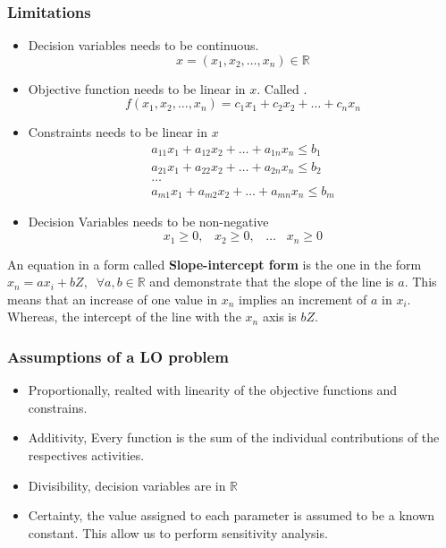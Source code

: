\subsubsection{Limitations}
\begin{itemize}
    \item Decision variables needs to be continuous. 
        \[x = (x_1, x_2, \dots , x_n) \in \mathbb{R}\]
    \item Objective function needs to be linear in $x$. Called \textit{}.
        \[ f(x_1,x_2, \dots, x_n) = c_1x_1 + c_2x_2 + \dots + c_nx_n \]
    \item Constraints needs to be linear in $x$
        \begin{gather*}
            a_{11}x_1 + a_{12}x_2 + \dots + a_{1n}x_n \leq b_1 \\
            a_{21}x_1 + a_{22}x_2 + \dots + a_{2n}x_n \leq b_2 \\
            \dots\\
            a_{m1}x_1 + a_{m2}x_2 + \dots + a_{mn}x_n \leq b_m
        \end{gather*}
    \item Decision Variables needs to be non-negative
        \[ x_1 \geq 0,\;\;\; x_2 \geq 0,\;\;\; \dots\;\;\; x_n \geq 0 \]
\end{itemize}

An equation in a form called \textbf{Slope-intercept form} is the one in the form $x_n = ax_i + bZ,\;\; \forall a,b \in \mathbb{R}$ and demonstrate that the slope of the line is $a$. This means that an increase
of one value in $x_n$ implies an increment of $a$ in $x_i$. Whereas, the intercept of the line with the $x_n$ axis is $bZ$.\\

\subsubsection{Assumptions of a LO problem}
\begin{itemize}
    \item Proportionally, realted with linearity of the objective functions and constrains.
    \item Additivity, Every function is the sum of the individual contributions of the respectives activities.
    \item Divisibility, decision variables are in $\mathbb{R}$
    \item Certainty, the value assigned to each parameter is assumed to be a known constant. This allow us to perform sensitivity analysis.
\end{itemize}


